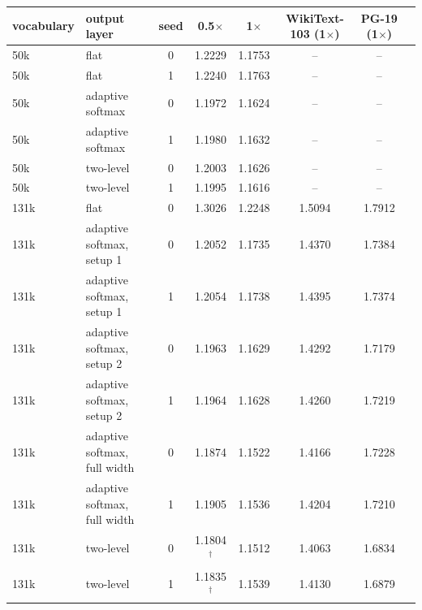 \begin{tabular}{llcccccc}
\toprule
vocabulary & output layer & seed & 0.5$\times$ & 1$\times$ & WikiText-103 (1$\times$) & PG-19 (1$\times$) \\
\midrule
50k & flat & 0 & 1.2229 & 1.1753 & -- & -- \\
50k & flat & 1 & 1.2240 & 1.1763 & -- & -- \\
50k & adaptive softmax & 0 & 1.1972 & 1.1624 & -- & -- \\
50k & adaptive softmax & 1 & 1.1980 & 1.1632 & -- & -- \\
50k & two-level & 0 & 1.2003 & 1.1626 & -- & -- \\
50k & two-level & 1 & 1.1995 & 1.1616 & -- & -- \\
\midrule
131k & flat & 0 & 1.3026 & 1.2248 & 1.5094 & 1.7912 \\
131k & adaptive softmax{,} setup 1 & 0 & 1.2052 & 1.1735 & 1.4370 & 1.7384 \\
131k & adaptive softmax{,} setup 1 & 1 & 1.2054 & 1.1738 & 1.4395 & 1.7374 \\
131k & adaptive softmax{,} setup 2 & 0 & 1.1963 & 1.1629 & 1.4292 & 1.7179 \\
131k & adaptive softmax{,} setup 2 & 1 & 1.1964 & 1.1628 & 1.4260 & 1.7219 \\
131k & adaptive softmax{,} full width & 0 & 1.1874 & 1.1522 & 1.4166 & 1.7228 \\
131k & adaptive softmax{,} full width & 1 & 1.1905 & 1.1536 & 1.4204 & 1.7210 \\
131k & two-level & 0 & 1.1804$^\dagger$ & 1.1512 & 1.4063 & 1.6834 \\
131k & two-level & 1 & 1.1835$^\dagger$ & 1.1539 & 1.4130 & 1.6879 \\
\bottomrule
\end{tabular}
